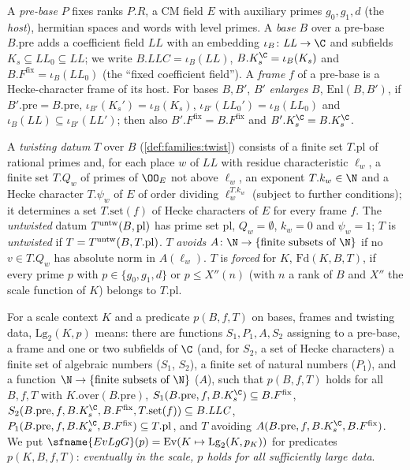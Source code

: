 A \emph{pre-base} $P$ fixes ranks $P.R$, a CM field $E$ with auxiliary primes $g_0,g_1,d$
(the \emph{host}), hermitian spaces and words with level primes. A \emph{base} $B$ over a
pre-base $B.\mathrm{pre}$ adds a coefficient field $\mathit{LL}$ with an embedding
$\iota_B\colon\mathit{LL}\to\C$ and subfields $K_s\subseteq\mathit{LL}_0\subseteq\mathit{LL}$; we write
$B.\mathit{LLC}=\iota_B(\mathit{LL})$, $B.K_s^{\C}=\iota_B(K_s)$ and $B.F^{\mathrm{fix}}=\iota_B(\mathit{LL}_0)$
(the ``fixed coefficient field''). A \emph{frame} $f$ of a pre-base is a Hecke-character frame of its host.
For bases $B,B'$, $B'$ \emph{enlarges} $B$, $\mathrm{Enl}(B,B')$, if $B'.\mathrm{pre}=B.\mathrm{pre}$,
$\iota_{B'}(K_s')=\iota_B(K_s)$, $\iota_{B'}(\mathit{LL}_0')=\iota_B(\mathit{LL}_0)$ and
$\iota_B(\mathit{LL})\subseteq\iota_{B'}(\mathit{LL}')$; then also $B'.F^{\mathrm{fix}}=B.F^{\mathrm{fix}}$ and
$B'.K_s^{\C}=B.K_s^{\C}$.

A \emph{twisting datum} $T$ over $B$ (\cref{def:families:twist}) consists of a finite set
$T.\mathrm{pl}$ of rational primes and, for each place $w$ of $\mathit{LL}$ with residue characteristic
$\ell_w$, a finite set $T.Q_w$ of primes of $\OO_E$ not above $\ell_w$, an exponent $T.k_w\in\N$ and a
Hecke character $T.\psi_w$ of $E$ of order dividing $\ell_w^{T.k_w}$ (subject to further conditions); it
determines a set $T.\mathrm{set}(f)$ of Hecke characters of $E$ for every frame $f$. The \emph{untwisted}
datum $T^{\mathrm{untw}}(B,\mathrm{pl})$ has prime set $\mathrm{pl}$, $Q_w=\emptyset$, $k_w=0$ and
$\psi_w=1$; $T$ is \emph{untwisted} if $T=T^{\mathrm{untw}}(B,T.\mathrm{pl})$. $T$ \emph{avoids}
$A\colon\N\to\{\text{finite subsets of }\N\}$ if no $v\in T.Q_w$ has absolute norm in $A(\ell_w)$. $T$ is
\emph{forced} for $K$, $\mathrm{Fd}(K,B,T)$, if every prime $p$ with $p\in\{g_0,g_1,d\}$ or
$p\le X''(n)$ (with $n$ a rank of $B$ and $X''$ the scale function of $K$) belongs to $T.\mathrm{pl}$.

\begin{definition}\label{pf:baselat1:def:large}
For a scale context $K$ and a predicate $p(B,f,T)$ on bases, frames and twisting data,
$\mathrm{Lg}_2(K,p)$ means: there are functions $S_1,P_1,A,S_2$ assigning to a pre-base, a frame and
one or two subfields of $\C$ (and, for $S_2$, a set of Hecke characters) a finite set of algebraic numbers
($S_1$, $S_2$), a finite set of natural numbers ($P_1$), and a function $\N\to\{\text{finite subsets of
}\N\}$ ($A$), such that $p(B,f,T)$ holds for all $B,f,T$ with $K.\mathrm{over}(B.\mathrm{pre})$,
$S_1(B.\mathrm{pre},f,B.K_s^{\C})\subseteq B.F^{\mathrm{fix}}$,
$S_2(B.\mathrm{pre},f,B.K_s^{\C},B.F^{\mathrm{fix}},T.\mathrm{set}(f))\subseteq B.\mathit{LLC}$,
$P_1(B.\mathrm{pre},f,B.K_s^{\C},B.F^{\mathrm{fix}})\subseteq T.\mathrm{pl}$, and $T$ avoiding
$A(B.\mathrm{pre},f,B.K_s^{\C},B.F^{\mathrm{fix}})$. We put
$\sfname{EvLgG}(p)=\mathrm{Ev}(K\mapsto\mathrm{Lg}_2(K,p_K))$ for predicates $p(K,B,f,T)$:
\emph{eventually in the scale, $p$ holds for all sufficiently large data}.
\end{definition}

